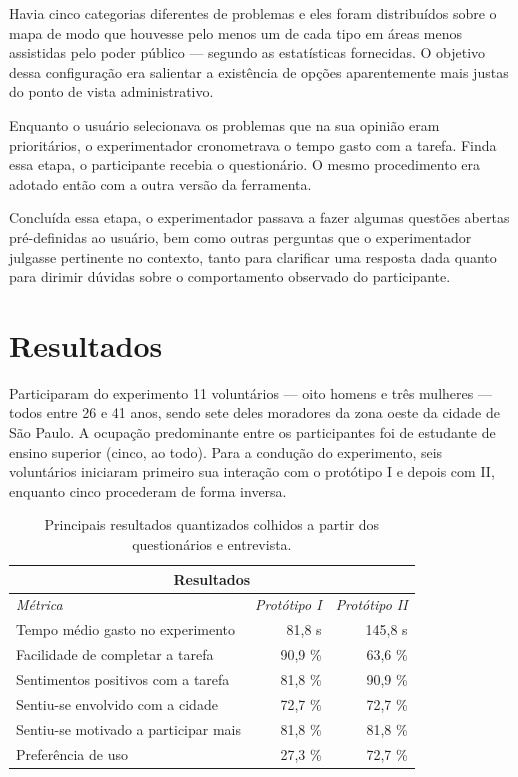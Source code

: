 \documentclass{sigchi}
\begin{document}
Havia cinco categorias diferentes de problemas e eles foram distribuídos sobre o mapa de modo que houvesse pelo menos um de cada tipo em áreas menos assistidas pelo poder público --- segundo as estatísticas fornecidas. O objetivo dessa configuração era salientar a existência de opções aparentemente mais justas do ponto de vista administrativo.

Enquanto o usuário selecionava os problemas que na sua opinião eram prioritários, o experimentador cronometrava o tempo gasto com a tarefa. Finda essa etapa, o participante recebia o questionário. O mesmo procedimento era adotado então com a outra versão da ferramenta.

Concluída essa etapa, o experimentador passava a fazer algumas questões abertas pré-definidas ao usuário, bem como outras perguntas que o experimentador julgasse pertinente no contexto, tanto para clarificar uma resposta dada quanto para dirimir dúvidas sobre o comportamento observado do participante.


\section{Resultados}
Participaram do experimento 11 voluntários --- oito homens e três mulheres --- todos entre 26 e 41 anos, sendo sete deles moradores da zona oeste da cidade de São Paulo. A ocupação predominante entre os participantes foi de estudante de ensino superior (cinco, ao todo). Para a condução do experimento, seis voluntários iniciaram primeiro sua interação com o protótipo I e depois com II, enquanto cinco procederam de forma inversa.

\begin{table}
	\centering
	\begin{tabular}{l r r}
		\multicolumn{3}{c}{\small{\textbf{Resultados}}} \\
		\midrule
		{\small\textit{Métrica}}
		& {\small \textit{Protótipo I}}
		& {\small \textit{Protótipo II}} \\
		\midrule
		Tempo médio gasto no experimento & 81,8 s & 145,8 s\\
		Facilidade de completar a tarefa & 90,9 \% & 63,6 \%\\
		Sentimentos positivos com a tarefa & 81,8 \% & 90,9 \% \\
		Sentiu-se envolvido com a cidade & 72,7 \% & 72,7 \%\\
		Sentiu-se motivado a participar mais & 81,8 \% & 81,8 \%\\
		Preferência de uso & 27,3 \% & 72,7 \%\\
	\end{tabular}
	\caption{Principais resultados quantizados colhidos a partir dos questionários e entrevista.}~\label{tab:table1}
\end{table}
\end{document}
